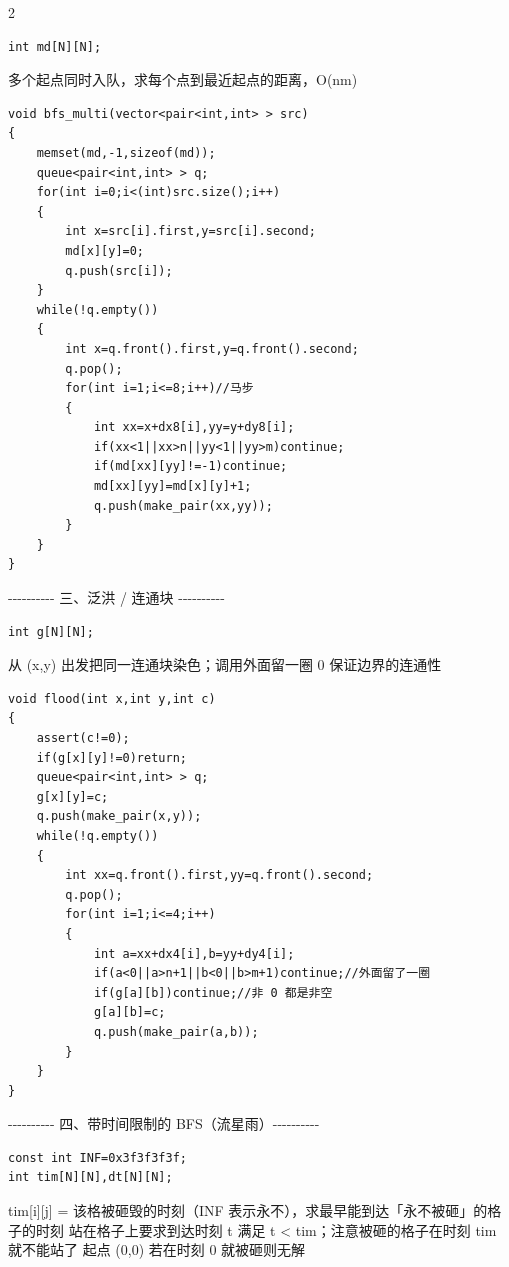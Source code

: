 \documentclass[UTF8,fontset=fandol,a4paper,twoside]{ctexart}
\newcommand{\note}[1]{{\fontsize{10}{12}\selectfont #1\par}}
\begin{document}
\begin{multicols}{2}
\begin{lstlisting}
int md[N][N];
\end{lstlisting}
\note{多个起点同时入队，求每个点到最近起点的距离，O(\allowbreak{}nm)\allowbreak{}}
\begin{lstlisting}
void bfs_multi(vector<pair<int,int> > src)
{
    memset(md,-1,sizeof(md));
    queue<pair<int,int> > q;
    for(int i=0;i<(int)src.size();i++)
    {
        int x=src[i].first,y=src[i].second;
        md[x][y]=0;
        q.push(src[i]);
    }
    while(!q.empty())
    {
        int x=q.front().first,y=q.front().second;
        q.pop();
        for(int i=1;i<=8;i++)//马步
        {
            int xx=x+dx8[i],yy=y+dy8[i];
            if(xx<1||xx>n||yy<1||yy>m)continue;
            if(md[xx][yy]!=-1)continue;
            md[xx][yy]=md[x][y]+1;
            q.push(make_pair(xx,yy));
        }
    }
}
\end{lstlisting}
\note{-\allowbreak{}-\allowbreak{}-\allowbreak{}-\allowbreak{}-\allowbreak{}-\allowbreak{}-\allowbreak{}-\allowbreak{}-\allowbreak{}-\allowbreak{} 三、泛洪 /\allowbreak{} 连通块 -\allowbreak{}-\allowbreak{}-\allowbreak{}-\allowbreak{}-\allowbreak{}-\allowbreak{}-\allowbreak{}-\allowbreak{}-\allowbreak{}-\allowbreak{}}
\begin{lstlisting}
int g[N][N];
\end{lstlisting}
\note{从 (\allowbreak{}x,\allowbreak{}y)\allowbreak{} 出发把同一连通块染色；调用外面留一圈 0 保证边界的连通性}
\begin{lstlisting}
void flood(int x,int y,int c)
{
    assert(c!=0);
    if(g[x][y]!=0)return;
    queue<pair<int,int> > q;
    g[x][y]=c;
    q.push(make_pair(x,y));
    while(!q.empty())
    {
        int xx=q.front().first,yy=q.front().second;
        q.pop();
        for(int i=1;i<=4;i++)
        {
            int a=xx+dx4[i],b=yy+dy4[i];
            if(a<0||a>n+1||b<0||b>m+1)continue;//外面留了一圈
            if(g[a][b])continue;//非 0 都是非空
            g[a][b]=c;
            q.push(make_pair(a,b));
        }
    }
}
\end{lstlisting}
\note{-\allowbreak{}-\allowbreak{}-\allowbreak{}-\allowbreak{}-\allowbreak{}-\allowbreak{}-\allowbreak{}-\allowbreak{}-\allowbreak{}-\allowbreak{} 四、带时间限制的 BFS（流星雨）-\allowbreak{}-\allowbreak{}-\allowbreak{}-\allowbreak{}-\allowbreak{}-\allowbreak{}-\allowbreak{}-\allowbreak{}-\allowbreak{}-\allowbreak{}}
\begin{lstlisting}
const int INF=0x3f3f3f3f;
int tim[N][N],dt[N][N];
\end{lstlisting}
\note{tim[\allowbreak{}i]\allowbreak{}[\allowbreak{}j]\allowbreak{} =\allowbreak{} 该格被砸毁的时刻（INF 表示永不），求最早能到达「永不被砸」的格子的时刻 站在格子上要求到达时刻 t 满足 t <\allowbreak{} tim；注意被砸的格子在时刻 tim 就不能站了 起点 (\allowbreak{}0,\allowbreak{}0)\allowbreak{} 若在时刻 0 就被砸则无解}

\end{multicols}
\end{document}
